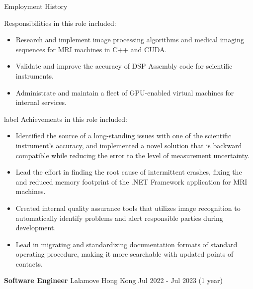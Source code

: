 \documentclass{resume} %
\begin{document}
\begin{rSection}{Employment History}
    \hspace*{1cm}%
    \begin{minipage}{.8\textwidth}%
        Responsibilities in this role included:
        \begin{itemize}
            \item Research and implement image processing algorithms and medical imaging sequences for MRI machines in C++ and CUDA.
            \item Validate and improve the accuracy of DSP Assembly code for scientific instruments.
            \item Administrate and maintain a fleet of GPU-enabled virtual machines for internal services.
        \end{itemize}
    \item[label]
        Achievements in this role included:
        \begin{itemize}
            \item Identified the source of a long-standing issues with one of the scientific instrument's accuracy, and implemented a novel solution that is backward compatible while reducing the error to the level of measurement uncertainty.
            \item Lead the effort in finding the root cause of intermittent crashes, fixing the and reduced memory footprint of the .NET Framework application for MRI machines.
            \item Created internal quality assurance tools that utilizes image recognition to automatically identify problems and alert responsible parties during development.
            \item Lead in migrating and standardizing documentation formats of standard operating procedure, making it more searchable with updated points of contacts.
        \end{itemize}
    \end{minipage}%
    
    \clearpage

    \item \textbf{Software Engineer} {Lalamove Hong Kong} \hfill Jul 2022 - Jul 2023 (1 year)\\
    
    \hspace*{1cm}%
    \begin{minipage}{.8\textwidth}%
        

\end{minipage}
\end{rSection}
\end{document}
